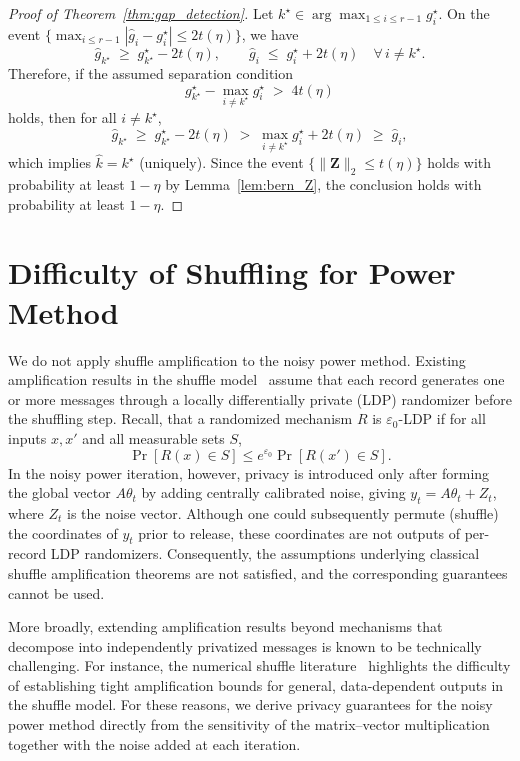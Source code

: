 \documentclass[11pt]{article}
\theoremstyle{plain}
\theoremstyle{definition}
\theoremstyle{remark}
\begin{document}
\begin{proof}[Proof of Theorem~\ref{thm:gap_detection}]
Let $k^\star\in\arg\max_{1\le i\le r-1} g_i^\star$.
On the event $\{\max_{i\le r-1}|\hat g_i-g_i^\star|\le 2t(\eta)\}$, we have
$$
\hat g_{k^\star} \;\ge\; g_{k^\star}^\star - 2t(\eta),
\qquad
\hat g_i \;\le\; g_i^\star + 2t(\eta)\quad \forall\, i\neq k^\star.
$$
Therefore, if the assumed separation condition
$$
g_{k^\star}^\star - \max_{i\neq k^\star} g_i^\star \;>\; 4t(\eta)
$$
holds, then for all $i\neq k^\star$,
$$
\hat g_{k^\star}
\;\ge\;
g_{k^\star}^\star - 2t(\eta)
\;>\;
\max_{i\neq k^\star} g_i^\star + 2t(\eta)
\;\ge\;
\hat g_i,
$$
which implies $\hat k=k^\star$ (uniquely).
Since the event $\{\|\mathbf Z\|_2\le t(\eta)\}$ holds with probability at least $1-\eta$
by Lemma~\ref{lem:bern_Z}, the conclusion holds with probability at least $1-\eta$.
\end{proof}







\section{Difficulty of Shuffling for Power Method} \label{sec:difficulty}


We do not apply shuffle amplification to the noisy power method. Existing amplification results in the shuffle model~\citep[e.g.,][]{feldman2022hiding,feldman2023stronger} assume that each record generates one or more messages through a locally differentially private (LDP) randomizer before the shuffling step. Recall, that a randomized mechanism $R$ is $\varepsilon_0$-LDP if for all inputs $x,x'$ and all measurable sets $S$,
$$
\Pr[R(x)\in S] \le e^{\varepsilon_0}\Pr[R(x')\in S].
$$
In the noisy power iteration, however, privacy is introduced only after forming the global vector $A\theta_t$ by adding centrally calibrated noise, giving $y_t = A\theta_t + Z_t$, where $Z_t$ is the noise vector. Although one could subsequently permute (shuffle) the coordinates of $y_t$ prior to release, these coordinates are not outputs of per-record LDP randomizers. Consequently, the assumptions underlying classical shuffle amplification theorems are not satisfied, and the corresponding guarantees cannot be used.

More broadly, extending amplification results beyond mechanisms that decompose into independently privatized messages is known to be technically challenging. For instance, the numerical shuffle literature~\cite[see, e.g., Sec. 5,][]{koskela2023numerical} highlights the difficulty of establishing tight amplification bounds for general, data-dependent outputs in the shuffle model. 
For these reasons, we derive privacy guarantees for the noisy power method directly from the sensitivity of the matrix–vector multiplication together with the noise added at each iteration.
\end{document}
